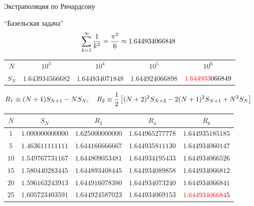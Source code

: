 \documentclass[10pt,pdf,hyperref={unicode},xcolor=dvipsnames]{beamer}
\newcommand{\lsq}{\left[}
\newcommand{\rsq}{\right]}
\begin{document}
\begin{frame}{Экстраполяция по Ричардсону}
    \vspace*{-0.5cm}
    \begin{block}{\enquote{Базельская задача}}
        \vspace*{-0.5cm}
        \begin{gather}
            \sum_{k=1}^\infty \frac{1}{k^2} = \frac{\pi^2}{6} \approx 1.644934066848 \notag 
        \end{gather}

        \vspace*{-0.5cm}
        \begin{table}[H]
            \centering
            \begin{tabular}{ccccc}
                \toprule
                $N$ & $10^{3}$ & $10^{4}$ & $10^{5}$ & $10^{6}$ \\
                $S_N$ & $1.643934566682$ & $1.644834071848$ & $1.644924066898$ &  $\color{red}{1.644933}\color{black}{066849}$ \\
                \bottomrule
            \end{tabular}
        \end{table}
        \vspace*{-0.5cm}
        
        \begin{gather}
            R_1 \equiv (N+1) S_{N+1} - N S_N, \quad R_2 \equiv \frac{1}{2} \lsq (N+2)^2 S_{N+2} - 2(N+1)^2 S_{N+1} + N^2 S_N \rsq \notag
        \end{gather}

        \vspace*{-0.5cm}
        \begin{table}[H]
            \centering
            \begin{tabular}{ccccc}
                \toprule
                $N$ & $S_N$ & $R_2$ & $R_4$ & $R_6$ \\
                \midrule
$1$  & $1.000000000000$ & $1.625000000000$ & $1.644965277778$ & $1.644935185185$ \\  
$5$  & $1.463611111111$ & $1.644166666667$ & $1.644935811130$ & $1.644934060147$ \\
$10$ & $1.549767731167$ & $1.644809053481$ & $1.644934195433$ & $1.644934066526$ \\
$15$ & $1.580440283445$ & $1.644893408445$ & $1.644934089858$ & $1.644934066812$ \\
$20$ & $1.596163243913$ & $1.644916078380$ & $1.644934073240$ & $1.644934066841$ \\ 
$25$ & $1.605723403591$ & $1.644924587023$ & $1.644934069153$ & $\color{red}{1.64493406684}\color{black}{5}$ \\
                \bottomrule
            \end{tabular}
        \end{table}
    \end{block}
\end{frame}
\end{document}
